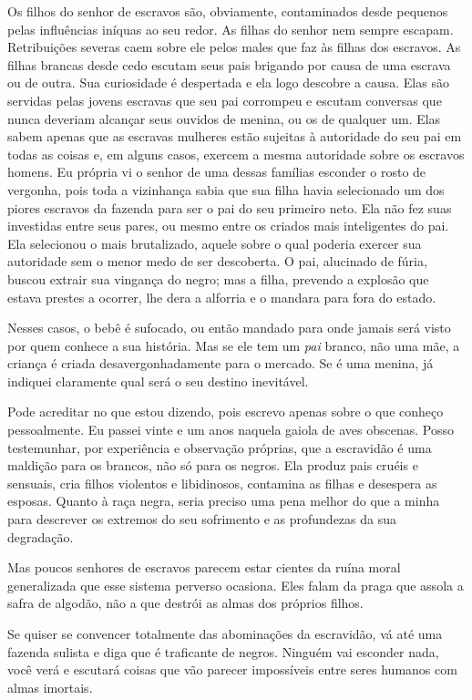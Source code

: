Os filhos do senhor de escravos são,
obviamente, contaminados desde pequenos pelas influências iníquas ao seu
redor. As filhas do senhor nem sempre escapam. Retribuições severas caem
sobre ele pelos males que faz às filhas dos escravos. As filhas brancas
desde cedo escutam seus pais brigando por causa de uma escrava ou de
outra. Sua curiosidade é despertada e ela logo descobre a causa. Elas
são servidas pelas jovens escravas que seu pai corrompeu e escutam
conversas que nunca deveriam alcançar seus ouvidos de menina, ou os de
qualquer um. Elas sabem apenas que as escravas mulheres estão sujeitas à
autoridade do seu pai em todas as coisas e, em alguns casos, exercem a
mesma autoridade sobre os escravos homens. Eu própria vi o senhor de uma
dessas famílias esconder o rosto de vergonha, pois toda a vizinhança
sabia que sua filha havia selecionado um dos piores escravos da fazenda
para ser o pai do seu primeiro neto. Ela não fez suas investidas entre
seus pares, ou mesmo entre os criados mais inteligentes do pai. Ela
selecionou o mais brutalizado, aquele sobre o qual poderia exercer sua
autoridade sem o menor medo de ser descoberta. O pai, alucinado de
fúria, buscou extrair sua vingança do negro; mas a filha, prevendo a
explosão que estava prestes a ocorrer, lhe dera a alforria e o mandara
para fora do estado.

Nesses casos, o bebê é sufocado, ou
então mandado para onde jamais será visto por quem conhece a sua
história. Mas se ele tem um \emph{pai} branco, não uma mãe, a criança é
criada desavergonhadamente para o mercado. Se é uma menina, já indiquei
claramente qual será o seu destino inevitável.

Pode acreditar no que estou dizendo,
pois escrevo apenas sobre o que conheço pessoalmente. Eu passei vinte e
um anos naquela gaiola de aves obscenas. Posso testemunhar, por
experiência e observação próprias, que a escravidão é uma maldição para
os brancos, não só para os negros. Ela produz pais cruéis e sensuais,
cria filhos violentos e libidinosos, contamina as filhas e desespera as
esposas. Quanto à raça negra, seria preciso uma pena melhor do que a
minha para descrever os extremos do seu sofrimento e as profundezas da
sua degradação.

Mas poucos senhores de escravos parecem
estar cientes da ruína moral generalizada que esse sistema perverso
ocasiona. Eles falam da praga que assola a safra de algodão, não a que
destrói as almas dos próprios filhos.

Se quiser se convencer totalmente das
abominações da escravidão, vá até uma fazenda sulista e diga que é
traficante de negros. Ninguém vai esconder nada, você verá e escutará
coisas que vão parecer impossíveis entre seres humanos com almas
imortais.

